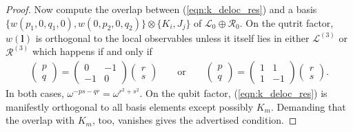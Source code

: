 \documentclass[10pt,a4paper]{amsart}
\def\R{\mathcal{R}}
\renewcommand{\vec}{\mathbf}
\begin{document}
\begin{proof}
	Now compute the overlap between (\ref{eqn:k_deloc_res}) 
	and a basis $\{w(p_1,0,q_1,0), w(0,p_2,0,q_2)\} \otimes \{ K_i, J_j\}$ of 
	$\mathcal{L}_0 \oplus \mathcal{R}_0$.
	On the qutrit factor, $w(\vec l)$ is orthogonal to the local observables unless it itself lies in either $\mathcal{L}^{(3)}$ or $\R^{(3)}$ which happens if and only if
	\begin{align*}
		\begin{pmatrix}
			p\\
			q
		\end{pmatrix}
		=
		\begin{pmatrix}
			0&-1\\
			-1&0
		\end{pmatrix}
		\begin{pmatrix}
			r\\
			s
		\end{pmatrix}
		\qquad
		\text{or}
		\qquad
		\begin{pmatrix}
			p\\
			q
		\end{pmatrix}
		=
		\begin{pmatrix}
			1&1\\
			1&-1
		\end{pmatrix}
		\begin{pmatrix}
			r\\
			s
		\end{pmatrix}.
	\end{align*}
	In both cases, $\omega^{-ps-qr}=\omega^{r^2+s^2}$.
	On the qubit factor, (\ref{eqn:k_deloc_res}) is manifestly orthogonal to all basis elements except possibly $K_m$.
	Demanding that the overlap with $K_m$, too, vanishes gives the advertised condition.
\end{proof}
\end{document}
